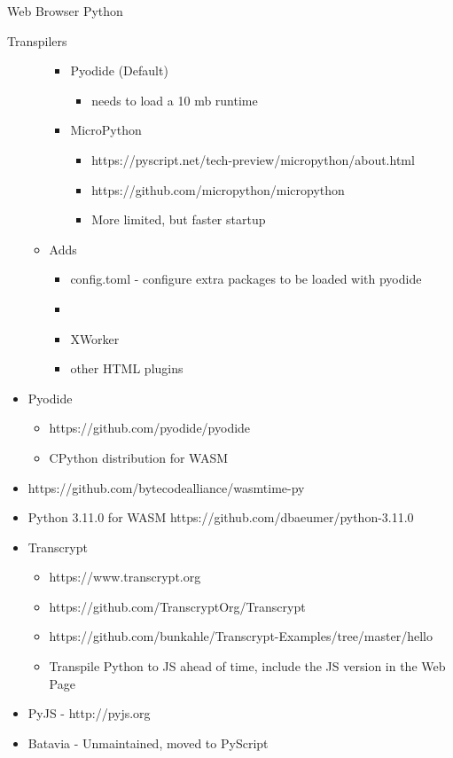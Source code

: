 \begin{block}{Web Browser Python}
\begin{block}{Transpilers}
\begin{itemize}
\begin{itemize}
    \begin{itemize}
    \tightlist
    \item
      Pyodide (Default)

      \begin{itemize}
      \tightlist
      \item
        needs to load a 10 mb runtime
      \end{itemize}
    \item
      MicroPython

      \begin{itemize}
      \tightlist
      \item
        https://pyscript.net/tech-preview/micropython/about.html
      \item
        https://github.com/micropython/micropython
      \item
        More limited, but faster startup
      \end{itemize}
    \end{itemize}
  \item
    Adds

    \begin{itemize}
    \item
      config.toml - configure extra packages to be loaded with pyodide
    \item
    \item
      XWorker
    \item
      other HTML plugins
    \end{itemize}
  \end{itemize}
\item
  Pyodide

  \begin{itemize}
  \tightlist
  \item
    https://github.com/pyodide/pyodide
  \item
    CPython distribution for WASM
  \end{itemize}
\item
  https://github.com/bytecodealliance/wasmtime-py
\item
  Python 3.11.0 for WASM https://github.com/dbaeumer/python-3.11.0
\item
  Transcrypt

  \begin{itemize}
  \tightlist
  \item
    https://www.transcrypt.org
  \item
    https://github.com/TranscryptOrg/Transcrypt
  \item
    https://github.com/bunkahle/Transcrypt-Examples/tree/master/hello
  \item
    Transpile Python to JS ahead of time, include the JS version in the Web Page
  \end{itemize}
\item
  PyJS - http://pyjs.org
\item
  Batavia - Unmaintained, moved to PyScript


\end{itemize}
\end{block}
\end{block}
